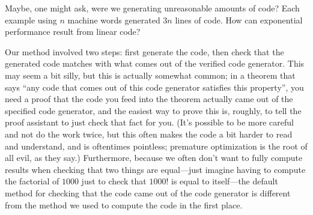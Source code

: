 
Maybe, one might ask, were we generating unreasonable amounts of code?
Each example using $n$ machine words generated $3n$ lines of code.
How can exponential performance result from linear code?

Our method involved two steps: first generate the code, then check that the generated code matches with what comes out of the verified code generator.
This may seem a bit silly, but this is actually somewhat common; in a theorem that says ``any code that comes out of this code generator satisfies this property'', you need a proof that the code you feed into the theorem actually came out of the specified code generator, and the easiest way to prove this is, roughly, to tell the proof assistant to just check that fact for you.
(It's possible to be more careful and not do the work twice, but this often makes the code a bit harder to read and understand, and is oftentimes pointless; premature optimization is the root of all evil, as they say.)
Furthermore, because we often don't want to fully compute results when checking that two things are equal---just imagine having to compute the factorial of $1000$ just to check that $1000!$ is equal to itself---the default method for checking that the code came out of the code generator is different from the method we used to compute the code in the first place.

